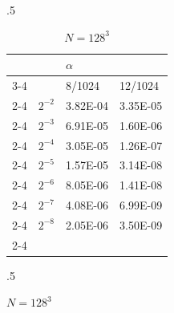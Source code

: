 \begin{table}[!htb]
    \begin{subtable}{.5\linewidth}
      \centering
        \begin{tabular}{llll}
                                &                               & $\alpha$                                              &                                                       \\ \cline{3-4} 
                                & \multicolumn{1}{l|}{}         & \multicolumn{1}{l|}{8/1024}                           & \multicolumn{1}{l|}{12/1024}                          \\ \cline{2-4} 
\multicolumn{1}{l|}{}           & \multicolumn{1}{l|}{$2^{-2}$} & \multicolumn{1}{l|}{\cellcolor[HTML]{C0C0C0}3.82E-04} & \multicolumn{1}{l|}{\cellcolor[HTML]{C0C0C0}3.35E-05} \\ \cline{2-4} 
\multicolumn{1}{l|}{}           & \multicolumn{1}{l|}{$2^{-3}$} & \multicolumn{1}{l|}{6.91E-05}                         & \multicolumn{1}{l|}{1.60E-06}                         \\ \cline{2-4} 
\multicolumn{1}{l|}{}           & \multicolumn{1}{l|}{$2^{-4}$} & \multicolumn{1}{l|}{\cellcolor[HTML]{C0C0C0}3.05E-05} & \multicolumn{1}{l|}{\cellcolor[HTML]{C0C0C0}1.26E-07} \\ \cline{2-4} 
\multicolumn{1}{l|}{$\Delta t$} & \multicolumn{1}{l|}{$2^{-5}$} & \multicolumn{1}{l|}{1.57E-05}                         & \multicolumn{1}{l|}{3.14E-08}                         \\ \cline{2-4} 
\multicolumn{1}{l|}{}           & \multicolumn{1}{l|}{$2^{-6}$} & \multicolumn{1}{l|}{\cellcolor[HTML]{C0C0C0}8.05E-06} & \multicolumn{1}{l|}{\cellcolor[HTML]{C0C0C0}1.41E-08} \\ \cline{2-4} 
\multicolumn{1}{l|}{}           & \multicolumn{1}{l|}{$2^{-7}$} & \multicolumn{1}{l|}{4.08E-06}                         & \multicolumn{1}{l|}{6.99E-09}                         \\ \cline{2-4} 
\multicolumn{1}{l|}{}           & \multicolumn{1}{l|}{$2^{-8}$} & \multicolumn{1}{l|}{\cellcolor[HTML]{C0C0C0}2.05E-06} & \multicolumn{1}{l|}{\cellcolor[HTML]{C0C0C0}3.50E-09} \\ \cline{2-4} 
\end{tabular}
\caption{$N=128^3$}
    \end{subtable}%
    \begin{subtable}{.5\linewidth}
      \centering
        \begin{tabular}{llll}

\end{tabular}
\end{subtable}
\end{table}

